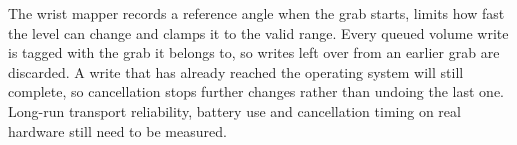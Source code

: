 \iffull
The wrist mapper records a reference angle when the grab starts, limits how fast the level can change and clamps it to the valid range. Every queued volume write is tagged with the grab it belongs to, so writes left over from an earlier grab are discarded. A write that has already reached the operating system will still complete, so cancellation stops further changes rather than undoing the last one. Long-run transport reliability, battery use and cancellation timing on real hardware still need to be measured.

\fi